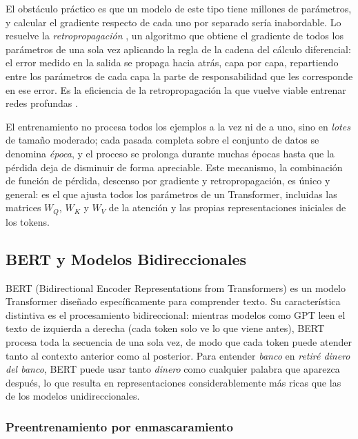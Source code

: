 El obstáculo práctico es que un modelo de este tipo tiene millones de parámetros, y calcular el gradiente respecto de cada uno por separado sería inabordable. Lo resuelve la \textit{retropropagación} \parencite{rumelhart_1986_backprop}, un algoritmo que obtiene el gradiente de todos los parámetros de una sola vez aplicando la regla de la cadena del cálculo diferencial: el error medido en la salida se propaga hacia atrás, capa por capa, repartiendo entre los parámetros de cada capa la parte de responsabilidad que les corresponde en ese error. Es la eficiencia de la retropropagación la que vuelve viable entrenar redes profundas \parencite{goodfellow_2016_deeplearning}.

El entrenamiento no procesa todos los ejemplos a la vez ni de a uno, sino en \textit{lotes} de tamaño moderado; cada pasada completa sobre el conjunto de datos se denomina \textit{época}, y el proceso se prolonga durante muchas épocas hasta que la pérdida deja de disminuir de forma apreciable. Este mecanismo, la combinación de función de pérdida, descenso por gradiente y retropropagación, es único y general: es el que ajusta todos los parámetros de un Transformer, incluidas las matrices $W_Q$, $W_K$ y $W_V$ de la atención y las propias representaciones iniciales de los tokens.

\subsection{BERT y Modelos Bidireccionales}
\label{subsec:bert}

BERT (Bidirectional Encoder Representations from Transformers) \parencite{devlin_2019_bert} es un modelo Transformer diseñado específicamente para comprender texto. Su característica distintiva es el procesamiento bidireccional: mientras modelos como GPT leen el texto de izquierda a derecha (cada token solo ve lo que viene antes), BERT procesa toda la secuencia de una sola vez, de modo que cada token puede atender tanto al contexto anterior como al posterior. Para entender \textit{banco} en \textit{retiré dinero del banco}, BERT puede usar tanto \textit{dinero} como cualquier palabra que aparezca después, lo que resulta en representaciones considerablemente más ricas que las de los modelos unidireccionales.

\subsubsection*{Preentrenamiento por enmascaramiento}


